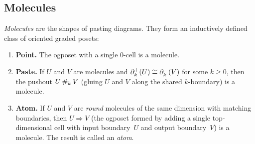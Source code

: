 \documentclass[acmsmall,screen,nonacm]{acmart}
\begin{document}
\subsection{Molecules}
\label{sec:molecules:def}

\emph{Molecules} are the shapes of pasting diagrams.  They form an
inductively defined class of oriented graded posets:
\begin{enumerate}
\item \textbf{Point.}  The ogposet with a single 0-cell is a molecule.
\item \textbf{Paste.}  If $U$ and $V$ are molecules and
  $\partial^{+}_{k}(U) \cong \partial^{-}_{k}(V)$ for some $k \geq 0$, then the
  pushout $U \mathbin{\#_{k}} V$ (gluing $U$ and $V$ along the shared
  $k$-boundary) is a molecule.
\item \textbf{Atom.}  If $U$ and $V$ are \emph{round} molecules of
  the same dimension with matching boundaries, then $U \Rightarrow V$
  (the ogposet formed by adding a single top-dimensional cell with
  input boundary~$U$ and output boundary~$V$) is a molecule.  The
  result is called an \emph{atom}.
\end{enumerate}
\end{document}
